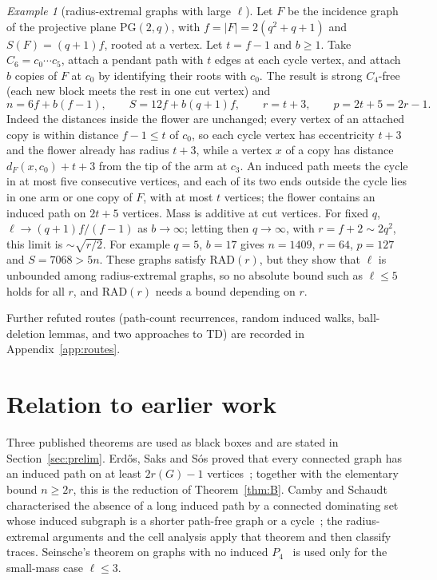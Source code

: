 \documentclass[11pt]{amsart}
\theoremstyle{definition}
\theoremstyle{remark}
\newtheorem{example}[theorem]{Example}
\newcommand{\lr}{\ell}
\newcommand{\pp}{p}
\newcommand{\RAD}{\mathrm{RAD}}
\begin{document}
\begin{example}[radius-extremal graphs with large $\lr$]\label{ex:plane}
Let $F$ be the incidence graph of the projective plane $\mathrm{PG}(2,q)$, with $f=|F|=2(q^2+q+1)$ and $S(F)=(q+1)f$, rooted at a vertex. Let $t=f-1$ and $b\ge1$. Take $C_6=c_0\cdots c_5$, attach a pendant path with $t$ edges at each cycle vertex, and attach $b$ copies of $F$ at $c_0$ by identifying their roots with $c_0$. The result is strong $C_4$-free (each new block meets the rest in one cut vertex) and
\[
n=6f+b(f-1),\qquad S=12f+b(q+1)f,\qquad r=t+3,\qquad \pp=2t+5=2r-1.
\]
Indeed the distances inside the flower are unchanged; every vertex of an attached copy is within distance $f-1\le t$ of $c_0$, so each cycle vertex has eccentricity $t+3$ and the flower already has radius $t+3$, while a vertex $x$ of a copy has distance $d_F(x,c_0)+t+3$ from the tip of the arm at $c_3$. An induced path meets the cycle in at most five consecutive vertices, and each of its two ends outside the cycle lies in one arm or one copy of $F$, with at most $t$ vertices; the flower contains an induced path on $2t+5$ vertices. Mass is additive at cut vertices. For fixed $q$, $\lr\to(q+1)f/(f-1)$ as $b\to\infty$; letting then $q\to\infty$, with $r=f+2\sim2q^2$, this limit is $\sim\sqrt{r/2}$. For example $q=5$, $b=17$ gives $n=1409$, $r=64$, $\pp=127$ and $S=7068>5n$. These graphs satisfy $\RAD(r)$, but they show that $\lr$ is unbounded among radius-extremal graphs, so no absolute bound such as $\lr\le5$ holds for all $r$, and $\RAD(r)$ needs a bound depending on $r$.
\end{example}

Further refuted routes (path-count recurrences, random induced walks, ball-deletion lemmas, and two approaches to TD) are recorded in Appendix~\ref{app:routes}.

\section{Relation to earlier work}\label{sec:related}

Three published theorems are used as black boxes and are stated in Section~\ref{sec:prelim}. Erd\H{o}s, Saks and S\'os proved that every connected graph has an induced path on at least $2r(G)-1$ vertices~\cite{ess}; together with the elementary bound $n\ge2r$, this is the reduction of Theorem~\ref{thm:B}. Camby and Schaudt characterised the absence of a long induced path by a connected dominating set whose induced subgraph is a shorter path-free graph or a cycle~\cite{cs}; the radius-extremal arguments and the cell analysis apply that theorem and then classify traces. Seinsche's theorem on graphs with no induced $P_4$~\cite{seinsche} is used only for the small-mass case $\lr\le3$.
\end{document}
